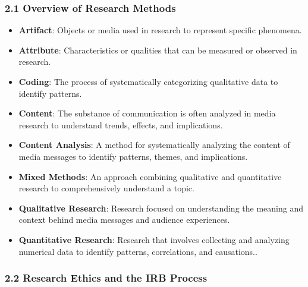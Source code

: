 \documentclass[
]{book}
\providecommand{\tightlist}{%
  \setlength{\itemsep}{0pt}\setlength{\parskip}{0pt}}
\begin{document}
\subsubsection*{\texorpdfstring{\textbf{2.1 Overview of Research Methods}}{2.1 Overview of Research Methods}}\label{overview-of-research-methods-1}

\begin{itemize}
\tightlist
\item
  \textbf{Artifact}: Objects or media used in research to represent specific phenomena.
\item
  \textbf{Attribute}: Characteristics or qualities that can be measured or observed in research.
\item
  \textbf{Coding}: The process of systematically categorizing qualitative data to identify patterns.
\item
  \textbf{Content}: The substance of communication is often analyzed in media research to understand trends, effects, and implications.
\item
  \textbf{Content Analysis}: A method for systematically analyzing the content of media messages to identify patterns, themes, and implications.
\item
  \textbf{Mixed Methods}: An approach combining qualitative and quantitative research to comprehensively understand a topic.
\item
  \textbf{Qualitative Research}: Research focused on understanding the meaning and context behind media messages and audience experiences.
\item
  \textbf{Quantitative Research}: Research that involves collecting and analyzing numerical data to identify patterns, correlations, and causations..
\end{itemize}

\subsubsection*{\texorpdfstring{\textbf{2.2 Research Ethics and the IRB Process}}{2.2 Research Ethics and the IRB Process}}\label{research-ethics-and-the-irb-process-1}
\end{document}
